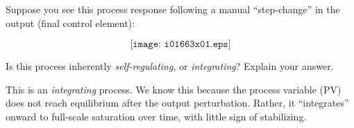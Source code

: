 

Suppose you see this process response following a manual ``step-change'' in the output (final control element):

$$\texttt{[image: i01663x01.eps]}$$

Is this process inherently {\it self-regulating}, or {\it integrating}?  Explain your answer.







This is an {\it integrating} process.  We know this because the process variable (PV) does not reach equilibrium after the output perturbation.  Rather, it ``integrates'' onward to full-scale saturation over time, with little sign of stabilizing.











